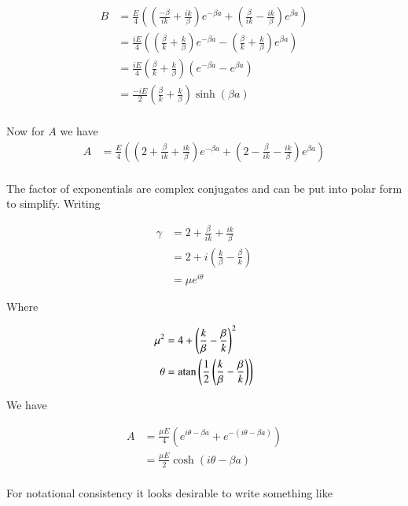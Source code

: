 \documentclass{article}
\DeclareMathOperator{\atan}{atan}
\begin{document}
\begin{align*}
B 
&= \frac{E}{4}\left( \left(\frac{-\beta}{ik} + \frac{ik}{\beta} \right) e^{ -\beta a} + \left(\frac{\beta}{ik} - \frac{ik}{\beta} \right) e^{ \beta a } \right) \\
&= \frac{iE}{4}\left( \left(\frac{\beta}{k} + \frac{k}{\beta} \right) e^{ -\beta a} - \left(\frac{\beta}{k} + \frac{k}{\beta} \right) e^{ \beta a } \right) \\
&= \frac{iE}{4}\left(\frac{\beta}{k} + \frac{k}{\beta} \right) \left( e^{ -\beta a} - e^{ \beta a } \right) \\
&= \frac{-iE}{2}\left(\frac{\beta}{k} + \frac{k}{\beta} \right) \sinh\left( \beta a \right) \\
\end{align*}

Now for $A$ we have
\begin{align*}
A &= \frac{E}{4}\left( \left(2 + \frac{\beta}{ik} + \frac{ik}{\beta} \right) e^{ -\beta a} + \left(2 - \frac{\beta}{ik} - \frac{ik}{\beta} \right) e^{ \beta a } \right) \\
\end{align*}

The factor of exponentials are complex conjugates and can be put into polar form to simplify.  Writing

\begin{align*}
\gamma 
&= 2 + \frac{\beta}{ik} + \frac{ik}{\beta} \\
&= 2 + i \left( \frac{k}{\beta} -\frac{\beta}{k} \right) \\
&= \mu e^{i \theta} 
\end{align*}

Where 

\begin{align}\label{eqn:muAndTheta}
\mu^2 &= 4 + \left( \frac{k}{\beta} -\frac{\beta}{k} \right)^2 \\
\theta &= \atan\left( \inv{2} \left(\frac{k}{\beta} - \frac{\beta}{k} \right) \right)
\end{align}

We have

\begin{align*}
A 
&= \frac{\mu E}{4}\left( e^{ i\theta -\beta a} + e^{ -(i \theta - \beta a) } \right) \\
&= \frac{\mu E}{2}\cosh\left( i\theta -\beta a \right) \\
\end{align*}

For notational consistency it looks desirable to write something like
\end{document}
